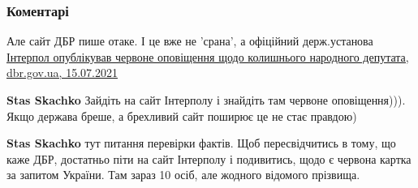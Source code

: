  
 
 
 
 
\subsubsection{Коментарі}
\label{sec:30_07_2021.fb.knjazhickij_nikolaj.1.propaganda.cmt}

\begin{itemize}
 
Але сайт ДБР пише отаке. І це вже не 'срана', а офіційний держ.установа
\href{https://dbr.gov.ua/news/kolishnogo-narodnogo-deputata-ogolosheno-v-mizhnarodnij-rozshuk}{%
Інтерпол опублікував червоне оповіщення щодо колишнього народного депутата, dbr.gov.ua, 15.07.2021%
}

\begin{itemize}
 
\textbf{Stas Skachko} Зайдіть на сайт Інтерполу і знайдіть там червоне оповіщення))). Якщо держава бреше, а брехливий сайт поширює це не стає правдою)

 
\textbf{Stas Skachko} тут питання перевірки фактів. Щоб пересвідчитись в тому, що каже ДБР, достатньо піти на сайт Інтерполу і подивитись, щодо є червона картка за запитом України. Там зараз 10 осіб, але жодного відомого прізвища.

 

\end{itemize}
\end{itemize}
